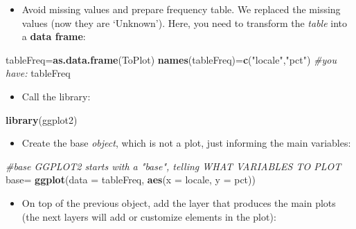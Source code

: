 \documentclass[]{article}
\newenvironment{Shaded}{\begin{snugshade}}{\end{snugshade}}
\newcommand{\KeywordTok}[1]{\textcolor[rgb]{0.13,0.29,0.53}{\textbf{#1}}}
\newcommand{\DataTypeTok}[1]{\textcolor[rgb]{0.13,0.29,0.53}{#1}}
\newcommand{\StringTok}[1]{\textcolor[rgb]{0.31,0.60,0.02}{#1}}
\newcommand{\CommentTok}[1]{\textcolor[rgb]{0.56,0.35,0.01}{\textit{#1}}}
\newcommand{\NormalTok}[1]{#1}
\providecommand{\tightlist}{%
  \setlength{\itemsep}{0pt}\setlength{\parskip}{0pt}}
\begin{document}
\begin{itemize}
\tightlist
\item
  Avoid missing values and prepare frequency table. We replaced the
  missing values (now they are `Unknown'). Here, you need to transform
  the \emph{table} into a \textbf{data frame}:
\end{itemize}

\begin{Shaded}
\begin{Highlighting}[]
\NormalTok{tableFreq=}\KeywordTok{as.data.frame}\NormalTok{(ToPlot)}
\KeywordTok{names}\NormalTok{(tableFreq)=}\KeywordTok{c}\NormalTok{(}\StringTok{"locale"}\NormalTok{,}\StringTok{"pct"}\NormalTok{)}
\CommentTok{#you have:}
\NormalTok{tableFreq}
\end{Highlighting}
\end{Shaded}

\begin{itemize}
\tightlist
\item
  Call the library:
\end{itemize}

\begin{Shaded}
\begin{Highlighting}[]
\KeywordTok{library}\NormalTok{(ggplot2)}
\end{Highlighting}
\end{Shaded}

\begin{itemize}
\tightlist
\item
  Create the base \emph{object}, which is not a plot, just informing the
  main variables:
\end{itemize}

\begin{Shaded}
\begin{Highlighting}[]
\CommentTok{#base GGPLOT2 starts with a "base", telling WHAT VARIABLES TO PLOT}
\NormalTok{base=}\StringTok{ }\KeywordTok{ggplot}\NormalTok{(}\DataTypeTok{data =}\NormalTok{ tableFreq, }
             \KeywordTok{aes}\NormalTok{(}\DataTypeTok{x =}\NormalTok{ locale,}
                 \DataTypeTok{y =}\NormalTok{ pct)) }
\end{Highlighting}
\end{Shaded}

\begin{itemize}
\tightlist
\item
  On top of the previous object, add the layer that produces the main
  plots (the next layers will add or customize elements in the plot):
\end{itemize}
\end{document}
